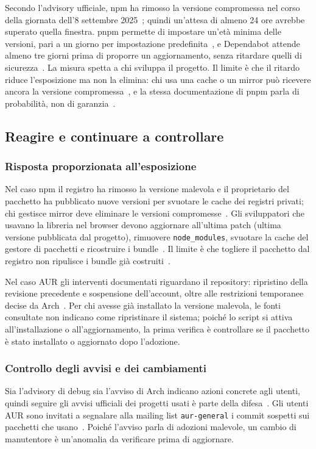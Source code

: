 Secondo l'advisory ufficiale, npm ha rimosso la versione compromessa nel corso della giornata dell'8 settembre 2025~\cite{debug2025}; quindi un'attesa di almeno 24 ore avrebbe superato quella finestra. pnpm permette di impostare un'età minima delle versioni, pari a un giorno per impostazione predefinita~\cite{pnpm-supply-chain}, e Dependabot attende almeno tre giorni prima di proporre un aggiornamento, senza ritardare quelli di sicurezza~\cite{github-disrupting-2026}. La misura spetta a chi sviluppa il progetto. Il limite è che il ritardo riduce l'esposizione ma non la elimina: chi usa una cache o un mirror può ricevere ancora la versione compromessa~\cite{debug2025}, e la stessa documentazione di pnpm parla di probabilità, non di garanzia~\cite{pnpm-supply-chain}.

\subsection{Reagire e continuare a controllare}
\label{sec:reagire-controllare}

\subsubsection{Risposta proporzionata all'esposizione}
\label{sec:risposta-proporzionata}

Nel caso npm il registro ha rimosso la versione malevola e il proprietario del pacchetto ha pubblicato nuove versioni per svuotare le cache dei registri privati; chi gestisce mirror deve eliminare le versioni compromesse~\cite{debug2025}. Gli sviluppatori che usavano la libreria nel browser devono aggiornare all'ultima patch (ultima versione pubblicata dal progetto), rimuovere \texttt{node\_modules}, svuotare la cache del gestore di pacchetti e ricostruire i bundle~\cite{debug2025}. Il limite è che togliere il pacchetto dal registro non ripulisce i bundle già costruiti~\cite{debug2025}.

Nel caso AUR gli interventi documentati riguardano il repository: ripristino della revisione precedente e sospensione dell'account, oltre alle restrizioni temporanee decise da Arch~\cite{aur-mail-gnome-randr,arch-aur-incident-2026}. Per chi avesse già installato la versione malevola, le fonti consultate non indicano come ripristinare il sistema; poiché lo script si attiva all'installazione o all'aggiornamento, la prima verifica è controllare se il pacchetto è stato installato o aggiornato dopo l'adozione.

\subsubsection{Controllo degli avvisi e dei cambiamenti}
\label{sec:controllo-avvisi}

Sia l'advisory di debug sia l'avviso di Arch indicano azioni concrete agli utenti, quindi seguire gli avvisi ufficiali dei progetti usati è parte della difesa~\cite{debug2025,arch-aur-incident-2026}. Gli utenti AUR sono invitati a segnalare alla mailing list \texttt{aur-general} i commit sospetti sui pacchetti che usano~\cite{arch-aur-incident-2026}. Poiché l'avviso parla di adozioni malevole, un cambio di manutentore è un'anomalia da verificare prima di aggiornare.
